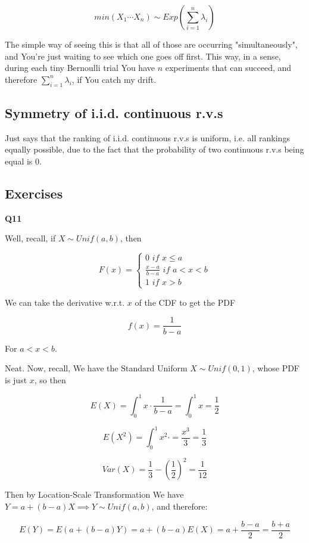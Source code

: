 \documentclass{article}
\begin{document}
		\[min(X_1\cdots X_n)\sim Exp(\sum^n_{i=1} \lambda_i)\] 
		
		The simple way of seeing this is that all of those are occurring "simultaneously", and You're just waiting to see which one goes off first. This way, in a sense, during each tiny Bernoulli trial You have $n$ experiments that can succeed, and therefore $\sum^n_{i=1} \lambda_i$, if You catch my drift.
		
	\subsection{Symmetry of i.i.d. continuous r.v.s}
	
		Just says that the ranking of i.i.d. continuous r.v.s is uniform, i.e. all rankings equally possible, due to the fact that the probability of two continuous r.v.s being equal is 0.
		
	\subsection{Exercises}
	
		\textbf{Q11}
		
			Well, recall, if $X\sim Unif(a, b)$, then
			
			\[F(x) =\begin{cases}
						0 \textit{ if } x \le a \\
						\frac{x-a}{b-a} \textit{ if } a < x < b \\
						1 \textit{ if } x > b
					\end{cases}\] 
				
			We can take the derivative w.r.t. $x$ of the CDF to get the PDF
			
			\[f(x) = \frac{1}{b-a} \]
			
			For $a < x < b$. 
			
			Neat. Now, recall, We have the Standard Uniform $X\sim Unif(0, 1)$, whose PDF is just $x$, so then
			
			\[ E(X) = \int^1_0 x\cdot \frac{1}{b-a} =  \int^1_0 x = \frac{1}{2} \]
			
			\[ E(X^2) = \int^1_0 x^2\cdot = \frac{x^3}{3} = \frac{1}{3}\]
		
			\[ Var(X) = \frac{1}{3} - \left(\frac{1}{2}\right)^2 = \frac{1}{12} \]
		
			Then by Location-Scale Transformation We have $Y = a + (b-a)X \implies Y\sim Unif(a, b)$, and therefore:
			
			\[ E(Y) = E(a + (b-a)Y) = a + (b-a)E(X) = a+\frac{b-a}{2} = \frac{b+a}{2} \]
\end{document}
